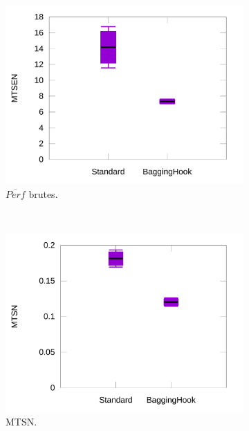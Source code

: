 \begin{figure}[htbp]
\begin{subfigure}[t]{0.49\textwidth}
			\includegraphics[width=\textwidth]{figures/ch5/baggingRawProducts}
			\caption{$\overline{Perf}$ brutes.}
			\label{fig:baggingRawProducts}
		\end{subfigure}
		~
		\begin{subfigure}[t]{0.49\textwidth}
			\centering
			\includegraphics[width=\textwidth]{figures/ch5/baggingNormTimes}
			\caption{MTSN.}
			\label{fig:baggingNormTimes}
		\end{subfigure}
				~
		\begin{subfigure}[t]{0.49\textwidth}
			\centering

\end{subfigure}
\end{figure}
